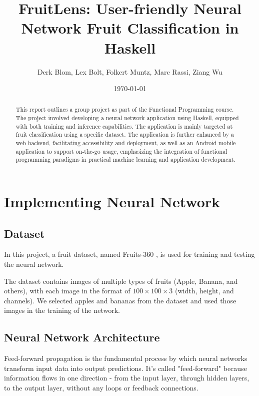 \documentclass[12pt,a4paper]{article}
\title{FruitLens: User-friendly Neural Network Fruit Classification in Haskell}
\author{Derk Blom, Lex Bolt, Folkert Muntz, Marc Rassi, Ziang Wu}
\date{\today}
\begin{document}
\maketitle

\begin{abstract}
This report outlines a group project as part of the Functional Programming course. The project involved developing a neural network application using Haskell, equipped with both training and inference capabilities. The application is mainly targeted at fruit classification using a specific dataset. The application is further enhanced by a web backend, facilitating accessibility and deployment, as well as an Android mobile application to support on-the-go usage, emphasizing the integration of functional programming paradigms in practical machine learning and application development.
\end{abstract}

\vfill

\tableofcontents

\clearpage


\section{Implementing Neural Network}

\subsection{Dataset}
In this project, a fruit dataset, named Fruits-360 \cite{oltean_fruits-360_2017}, is used for training and testing the neural network. 

The dataset contains images of multiple types of fruits (Apple, Banana, and others), with each image in the format of $100 \times 100 \times 3$ (width, height, and channels). We selected apples and bananas from the dataset and used those images in the training of the network.

% 

\subsection{Neural Network Architecture}
Feed-forward propagation is the fundamental process by which neural networks transform input data into output predictions. It's called "feed-forward" because information flows in one direction - from the input layer, through hidden layers, to the output layer, without any loops or feedback connections.
\end{document}
